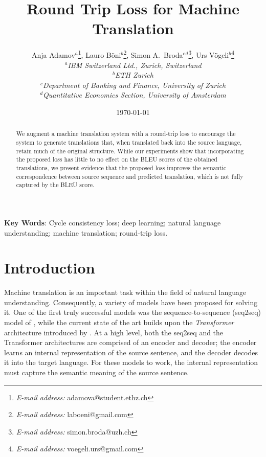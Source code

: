 \documentclass[10pt,a4paper]{article}
\begin{document}
\title{Round Trip Loss for Machine Translation}
\date{\today}
\author{
Anja Adamov$\mbox{}^a$\thanks{\emph{E-mail address:} adamova@student.ethz.ch},
Lauro B\"{o}ni$\mbox{}^b$\thanks{\emph{E-mail address:} laboeni@gmail.com},
Simon A.\ Broda$\mbox{}^c\mbox{}^d$\thanks{\emph{E-mail address:} simon.broda@uzh.ch},
Urs V\"{o}geli$\mbox{}^b$\thanks{\emph{E-mail address:} voegeli.urs@gmail.com}
\medskip \\
\textit{\small $\mbox{}^a$IBM Switzerland Ltd., Zurich, Switzerland}
\medskip \\
\textit{\small $\mbox{}^b$ETH Zurich}
\medskip \\
\textit{\small $\mbox{}^c$Department of Banking and Finance, University of Zurich}
\medskip \\
\textit{\small $\mbox{}^d$Quantitative Economics Section, University of Amsterdam}
}
\maketitle \setcounter{page}{0}\thispagestyle{empty}
\begin{abstract}
We augment a machine translation system with a round-trip loss to encourage the system to generate translations that, when translated back into the source language, retain much of the original structure. While our experiments show that incorporating the proposed loss has little to no effect on the BLEU scores of the obtained translations, we present evidence that the proposed loss improves the semantic correspondence between source sequence and predicted translation, which is not fully captured by the BLEU score. 
\end{abstract}
\bigskip \textbf{Key Words}: Cycle consistency loss; deep learning; natural language understanding; machine translation; round-trip loss.
\newpage
\setcounter{page}{1}
\section{Introduction}
Machine translation is an important task within the field of natural language understanding. Consequently, a variety of models have been proposed for solving it. One of the first truly successful models was the sequence-to-sequence (seq2seq) model of \citet{seq2seq}, while the current state of the art builds upon the \emph{Transformer} architecture introduced by \citet{transformer}. At a high level, both the seq2seq and the Transformer architectures are comprised of an encoder and decoder; the encoder learns an internal representation of the source sentence, and the decoder decodes it into the target language. For these models to work, the internal representation must capture the semantic meaning of the source sentence.
\end{document}
